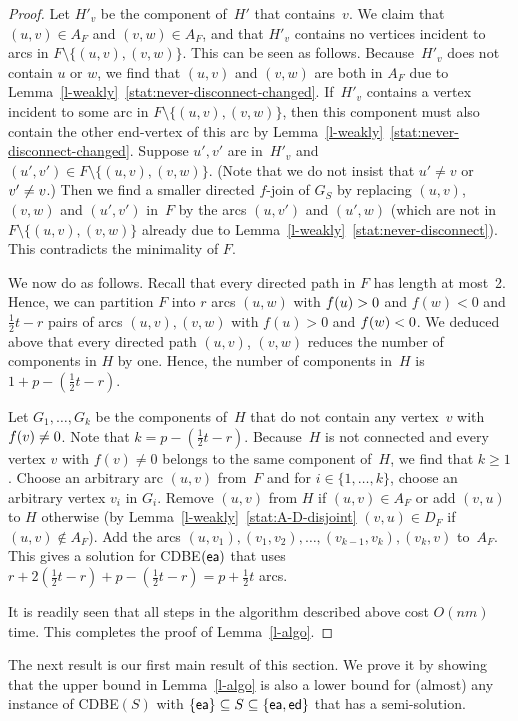 \documentclass[11pt]{llncs}
\newcommand{\ed}{{\sf ed}}
\newcommand{\ea}{{\sf ea}}
\newcommand{\cdbe}{{\sc CDBE}}
\begin{document}
\begin{proof}
Let $H'_v$ be the component of~$H'$ that contains~$v$.
We claim that $(u,v)\in A_F$ and $(v,w)\in A_F$, and that $H'_v$ contains no vertices incident to arcs in $F \setminus
\{(u,v),(v,w)\}$. This can be seen as follows.  Because~$H'_v$ does not contain $u$ or $w$, we find that $(u,v)$ and $(v,w)$ are both
in $A_F$ due to Lemma~\ref{l-weakly}~\ref{stat:never-disconnect-changed}. If~$H'_v$
contains a vertex incident to some arc in $F\setminus
\{(u,v),(v,w)\}$, then this component must also contain the other end-vertex of
this arc by Lemma~\ref{l-weakly}~\ref{stat:never-disconnect-changed}. Suppose $u',v'$ are in~$H'_v$ and $(u',v')\in F\setminus \{(u,v),(v,w)\}$. (Note
that we do not insist that $u'\neq v$ or $v' \neq\nobreak v$.) Then we find a smaller
directed $f$-join of $G_S$ by replacing $(u,v)$, $(v,w)$ and $(u',v')$ in~$F$
by the arcs $(u,v')$ and $(u',w)$ (which are not in $F\setminus\{(u,v),
(v,w)\}$ already due to Lemma~\ref{l-weakly}~\ref{stat:never-disconnect}). This contradicts the
minimality of $F$.

We now do as follows.  Recall that every directed path in $F$ has length at
most~2.  Hence, we can partition $F$ into $r$ arcs $(u,w)$ with $f(u)>\nobreak 0$ and
$f(w)<0$ and $\frac{1}{2}t-r$ pairs of arcs $(u,v),(v,w)$ with $f(u)>0$ and
$f(w)<\nobreak 0$.  We deduced above that every directed path $(u,v)$, $(v,w)$ reduces
the number of components in $H$ by one.  Hence, the number of components in~$H$
is $1+p-(\frac{1}{2}t-r)$.  

Let $G_1,\ldots,G_k$ be the components of~$H$ that do not contain any
vertex~$v$ with $f(v) \neq\nobreak 0$. Note that $k=p-(\frac{1}{2}t-r)$.
Because~$H$ is not connected and every vertex $v$ with
$f(v)\neq 0$ belongs to the same component of~$H$, we find that $k\geq 1$.
Choose an arbitrary arc $(u,v)$ from~$F$ and for $i\in \{1,\ldots,k\}$,  choose
an arbitrary vertex $v_i$ in $G_i$.  Remove $(u,v)$ from $H$ if $(u,v)\in A_F$
or add $(v,u)$ to $H$  otherwise (by Lemma~\ref{l-weakly}~\ref{stat:A-D-disjoint} $(v,u)\in D_F$
if $(u,v)\notin A_F$).  Add the arcs
$(u,v_1),(v_1,v_2),\ldots,(v_{k-1},v_k),(v_k,v)$ to~$A_F$.  This gives a
solution for \cdbe$(\ea)$ that uses
$r+2(\frac{1}{2}t-r)+p-(\frac{1}{2}t-r)=p+\frac{1}{2}t$ arcs.

\medskip
\noindent
It is readily seen that all steps in the algorithm described above cost $O(nm)$
time. 
This completes the proof of Lemma~\ref{l-algo}.
\end{proof}


\noindent
The next result is our first main result of this section. 
We prove it by showing that the upper bound in Lemma~\ref{l-algo} is also a lower bound for (almost) any instance of \cdbe$(S)$ with $\{\ea\}\subseteq S \subseteq \{\ea,\ed
\}$ that has a semi-solution.
\end{document}
